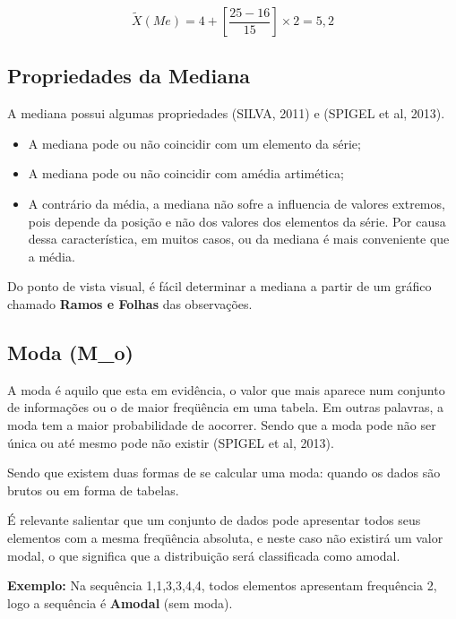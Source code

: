 \begin{equation}\label{}
    \tilde{X}(Me)= 4+\left[\frac{25-16}{15}\right]\times 2 = 5,2
\end{equation}








\subsection{Propriedades da Mediana}

A mediana possui algumas propriedades (SILVA, 2011) e (SPIGEL et al, 2013).

\begin{itemize}
\item A mediana pode ou não coincidir com um elemento da série;
\item A mediana pode ou não coincidir com amédia artimética;
\item A contrário da média, a mediana não sofre a influencia de valores extremos, pois depende da posição e não dos valores dos elementos da série. Por causa dessa característica, em muitos casos, ou da mediana é mais conveniente que a média.    
\end{itemize}


Do ponto de vista visual, é fácil determinar a mediana a partir de um gráfico chamado \textbf{Ramos e Folhas} das observações.




\subsection{Moda (M_{o})}

A moda é aquilo que esta em evidência, o valor que mais aparece num conjunto de informações ou o de maior freqüência em uma tabela. Em outras palavras, a moda tem a maior probabilidade de aocorrer. Sendo que a moda pode não ser única ou até mesmo pode não existir (SPIGEL et al, 2013).\vskip0.3cm


Sendo que existem duas formas de se calcular uma moda: quando os dados são brutos ou em forma de tabelas.\vskip0.3cm

É relevante salientar que um conjunto de dados pode apresentar todos seus elementos com a mesma freqüência absoluta, e neste caso não existirá um valor modal, o que significa que a distribuição será classificada como amodal.\vskip0.3cm

\textbf{Exemplo:} Na sequência 1,1,3,3,4,4, todos elementos apresentam frequência 2, logo a sequência é \textbf{Amodal} (sem moda).\vskip0.3cm


